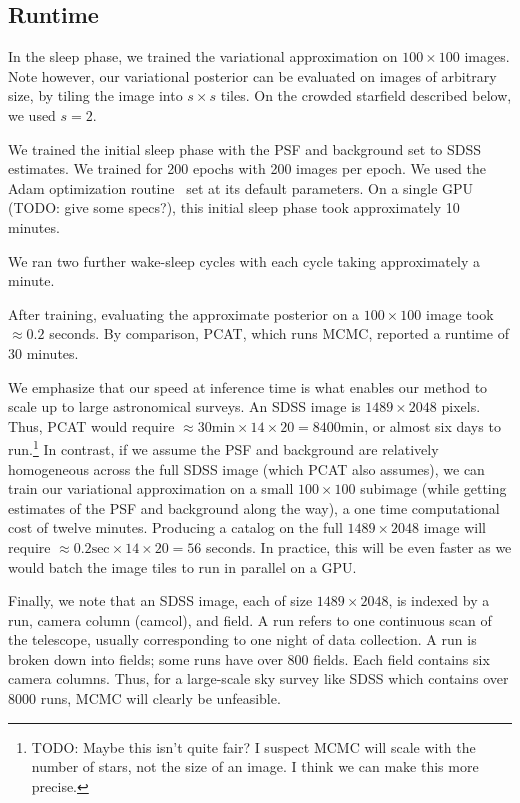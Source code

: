 \subsection{Runtime} 
\label{sec:runtime}
In the sleep phase, we trained the variational approximation on 
$100 \times 100$ images. Note however, our variational posterior can be evaluated on images of arbitrary size, by tiling the image into $s \times s$ tiles. On the crowded starfield described below, we used $s = 2$. 

We trained the initial sleep phase with the PSF and background set to SDSS estimates. We trained for 200 epochs with 200 images per epoch. We used 
the Adam optimization routine~\cite{kingma2014adam} set at its default parameters. On a single GPU (TODO: give some specs?), this initial sleep phase took approximately 10 minutes. 

We ran two further wake-sleep cycles with each cycle taking approximately a minute. 

After training, evaluating the approximate posterior on a $100 \times 100$ 
image took $\approx 0.2$ seconds. By comparison, PCAT, which runs MCMC, 
reported a runtime of 30 minutes. 

We emphasize that our speed at inference time is what enables our method to 
scale up to large astronomical surveys. An SDSS image is $1489 \times 2048$ 
pixels. Thus, PCAT would require 
$\approx 30\text{min} \times 14 \times 20 = 8400$min, or almost six days to run.\footnote{TODO: 
Maybe this isn't quite fair? I suspect MCMC will scale
with the number of stars, not the size of an image. I think we can make 
this more precise.}
In contrast, if we assume the PSF and background are relatively homogeneous 
across the full SDSS image (which PCAT also assumes), we can 
train our variational approximation on a small $100 \times 100$ subimage
(while getting estimates of the PSF and background along the way),
a one time computational cost of twelve minutes. 
Producing a catalog on the full $1489 \times 2048$ image will require 
$\approx 0.2\text{sec} \times 14 \times 20 = 56$ seconds. In practice, 
this will be even faster as we would batch the image tiles to run in parallel on a GPU. 

Finally, we note that an SDSS image, each of size $1489 \times 2048$, is indexed by a run, camera column (camcol), and field. A run refers to one continuous scan of the telescope, usually corresponding to one night of data collection. A run is broken down 
into fields; some runs have over 800 fields. Each field contains 
six camera columns. Thus, for a large-scale sky survey like SDSS which 
contains over 8000 runs, MCMC will clearly be unfeasible. 



